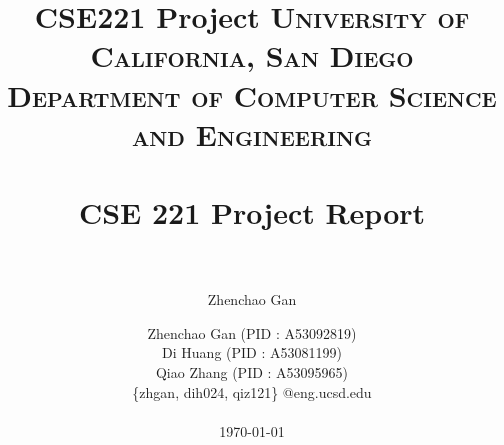 \documentclass[12pt]{third-rep}
\title{CSE221 Project}
\author{Zhenchao Gan}
\title{
		\vspace{-0.5in} 	
		\usefont{OT1}{bch}{b}{n}
		\normalfont \normalsize \textsc{University of California, San Diego \\
								Department of Computer Science and Engineering } \\ [25pt]
		\horrule{0.5pt} \\[0.4cm]
		\huge CSE 221 Project Report\\
		\horrule{2pt} \\[0.5cm]
}
\author{
		\normalfont 						\normalsize
        				Zhenchao Gan  (PID : A53092819)\\[-3pt]		\normalsize
				Di Huang (PID : A53081199)\\[-3pt]		\normalsize
        				Qiao Zhang (PID : A53095965)\\[-3pt]				\normalsize
				\{zhgan, dih024, qiz121\} @eng.ucsd.edu \\ \\
       		 \today
}
\date{}
\begin{document}
\maketitle

\pagebreak

\tableofcontents





%
%



\end{document}
